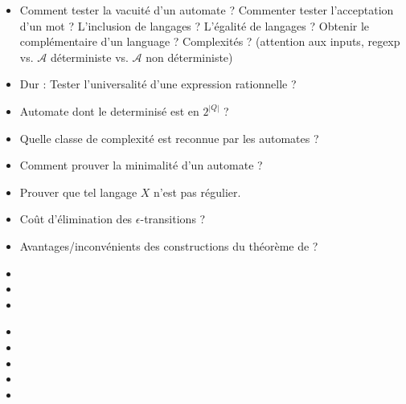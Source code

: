 \documentclass{agregfiche}
\begin{document}
\secquestionsclassiques
\begin{itemize}
\item Comment tester la vacuité d'un automate ? Commenter tester 
l'acceptation d'un mot ? L'inclusion de langages ? L'égalité de 
langages ? Obtenir le complémentaire d'un language ? Complexités ? 
(attention aux inputs, regexp vs. $\mathcal{A}$ déterministe vs. 
$\mathcal{A}$ non déterministe)


\item Dur : Tester l'universalité d'une expression rationnelle ?
\item Automate dont le determinisé est en $2^{|Q|}$ ?
\item Quelle classe de complexité est reconnue par les automates ?
\item Comment prouver la minimalité d'un automate ?
\item Prouver que tel langage $X$ n'est pas régulier.
\item Coût d'élimination des $\epsilon$-transitions ?
\item Avantages/inconvénients des constructions du théorème de  
 ?


\end{itemize}

\secreferences
\begin{itemize}
\item 
\item 
\item 
\end{itemize}

\secdev
\begin{itemize}
\item 
\item 
\item 
\item 
\item 

\end{itemize}
\end{document}
